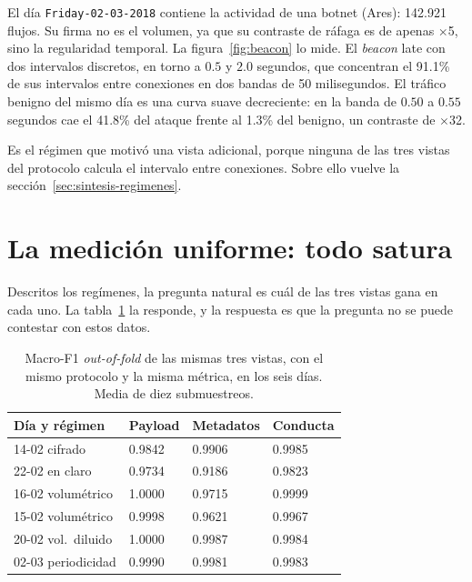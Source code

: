 El día \texttt{Friday-02-03-2018} contiene la actividad de una botnet (Ares):
142.921 flujos. Su firma no es el volumen, ya que su contraste de ráfaga es de
apenas $\times$5, sino la regularidad temporal. La figura~\ref{fig:beacon} lo
mide. El \emph{beacon} late con dos intervalos discretos, en torno a $0.5$ y
$2.0$ segundos, que concentran el 91.1\% de sus intervalos entre conexiones en
dos bandas de 50 milisegundos. El tráfico benigno del mismo día es una curva
suave decreciente: en la banda de $0.50$ a $0.55$ segundos cae el 41.8\% del
ataque frente al 1.3\% del benigno, un contraste de $\times$32.

Es el régimen que motivó una vista adicional, porque ninguna de las tres vistas
del protocolo calcula el intervalo entre conexiones. Sobre ello vuelve la
sección~\ref{sec:sintesis-regimenes}.

\section{La medición uniforme: todo satura}
\label{sec:saturacion}

Descritos los regímenes, la pregunta natural es cuál de las tres vistas gana en
cada uno. La tabla~\ref{tab:saturacion} la responde, y la respuesta es que la
pregunta no se puede contestar con estos datos.

\begin{table}[htbp]
  \centering
  \caption[Macro-F1 intra-día en los seis días]{Macro-F1 \emph{out-of-fold} de
  las mismas tres vistas, con el mismo protocolo y la misma métrica, en los seis
  días. Media de diez submuestreos.}
  \label{tab:saturacion}
  \begin{tabular}{llll}
    \toprule
    \textbf{Día y régimen} & \textbf{Payload} & \textbf{Metadatos} & \textbf{Conducta} \\
    \midrule
    14-02 cifrado       & 0.9842 & 0.9906 & 0.9985 \\
    22-02 en claro      & 0.9734 & 0.9186 & 0.9823 \\
    16-02 volumétrico   & 1.0000 & 0.9715 & 0.9999 \\
    15-02 volumétrico   & 0.9998 & 0.9621 & 0.9967 \\
    20-02 vol.\ diluido & 1.0000 & 0.9987 & 0.9984 \\
    02-03 periodicidad  & 0.9990 & 0.9981 & 0.9983 \\
    \bottomrule
  \end{tabular}
\end{table}

